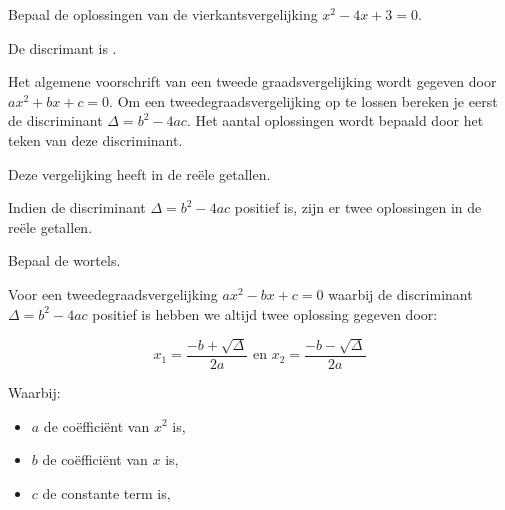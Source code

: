 \documentclass{ximera}
\begin{document}
\begin{exercise}

Bepaal de oplossingen van de vierkantsvergelijking \(x^2 - 4x + 3 = 0\).   

\begin{question}
De discrimant is \choicepositief. 

\begin{feedback}
    Het algemene voorschrift van een tweede graadsvergelijking wordt gegeven door  \(ax^2 + bx + c = 0\). 
    Om een tweedegraadsvergelijking op te lossen bereken je eerst de discriminant \(\Delta = b^2 - 4ac\). 
    Het aantal oplossingen wordt bepaald door het teken van deze discriminant. 
    
\end{feedback}
\end{question}

\begin{question}
    Deze vergelijking heeft \choicetwee in de reële getallen. 
    \begin{feedback}
        Indien de discriminant \(\Delta = b^2 - 4ac\) positief is, zijn er twee oplossingen in de reële getallen. 
    \end{feedback}
\end{question}

\begin{question}
    Bepaal de wortels. 
    
    \begin{hint}
        
        Voor een tweedegraadsvergelijking  \(ax^2 - bx + c = 0\) waarbij de discriminant \( \Delta = b^2 - 4ac \) positief is hebben we altijd twee oplossing gegeven door: 
        
        \[
            x_{1} = \frac{-b + \sqrt{\Delta}}{2a}  \text{ en }  x_{2} = \frac{-b - \sqrt{\Delta}}{2a}
            \]
            
            Waarbij:
            \begin{itemize}
                \item \( a \) de coëfficiënt van \( x^2 \) is,
                \item \( b \) de coëfficiënt van \( x \) is,
                \item \( c \) de constante term is,
            \end{itemize}
            
    \end{hint}
    


\end{question}
\end{exercise}
\end{document}
